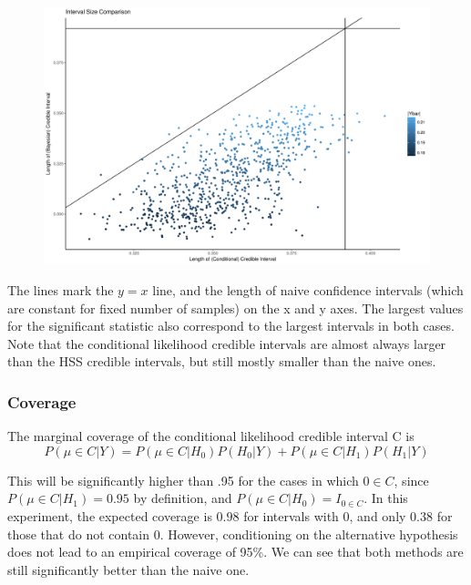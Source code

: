 \documentclass[AMA,STIX1COL]{WileyNJD-v2}\usepackage[]{graphicx}\usepackage[]{color}
\newenvironment{knitrout}{}{} %
\begin{document}
\begin{figure}
\begin{knitrout}
\color{fgcolor}

{\centering \includegraphics[width=6in]{figure/unnamed-chunk-11-1} 

}



\end{knitrout}
\end{figure}

The lines mark the $y = x$ line, and the length of naive confidence intervals (which are constant for fixed number of samples) on the x and y axes. The largest values for the significant statistic also correspond to the largest intervals in both cases. Note that the conditional likelihood credible intervals are almost always larger than the HSS credible intervals, but still mostly smaller than the naive ones. 

\subsubsection{Coverage}


The marginal coverage of the conditional likelihood credible interval C is 
\begin{equation}
P(\mu \in C|Y) = P(\mu \in C|H_0) P(H_0|Y)+P(\mu \in C|H_1) P(H_1|Y)
\end{equation}

This will be significantly higher than .95 for the cases in which $0 \in C$, since $P(\mu \in C|H_1) =0.95$ by definition, and  $P(\mu \in C|H_0) = I_{0 \in C}$. In this experiment, the expected coverage is $0.98$ for intervals with 0, and only $0.38$ for those that do not contain 0.  However, conditioning on the alternative hypothesis does not lead to an empirical coverage of 95\%. We can see that both methods are still significantly better than the naive one.
\end{document}
